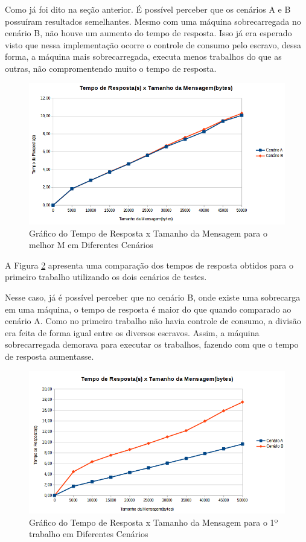 \documentclass[
	12pt,				%
    oneside,			%
	a4paper,			%
	english,			%
	brazil,				%
	]{abntex2}
\begin{document}
Como já foi dito na seção anterior. É possível perceber que os cenários A e B possuíram resultados semelhantes.
Mesmo com uma máquina sobrecarregada no cenário B, não houve um aumento do tempo de resposta. Isso já era esperado visto que nessa implementação ocorre o controle de consumo pelo escravo, dessa forma, a máquina mais sobrecarregada, executa menos trabalhos do que as outras, não compromentendo muito o tempo de resposta.

\begin{figure}[!htb]
\centering
\includegraphics[scale=0.7]{figuras/T2_AxB.png}
\caption{Gráfico do Tempo de Resposta x Tamanho da Mensagem para o melhor M em Diferentes Cenários}
\label{fig:tempo_respostaXtamanho_msg_T2_AxB}
\end{figure}

A Figura \ref{fig:tempo_respostaXtamanho_msg_T1_AxB} apresenta uma comparação dos tempos de resposta obtidos para o primeiro trabalho utilizando os dois cenários de testes.

Nesse caso, já é possível perceber que no cenário B, onde existe uma sobrecarga em uma máquina, o tempo de resposta é maior do que quando comparado ao cenário A. Como no primeiro trabalho não havia controle de consumo, a divisão era feita de forma igual entre os diversos escravos. Assim, a máquina sobrecarregada demorava para executar os trabalhos, fazendo com que o tempo de resposta aumentasse.

\begin{figure}[!htb]
\centering
\includegraphics[scale=0.7]{figuras/T1_AxB.png}
\caption{Gráfico do Tempo de Resposta x Tamanho da Mensagem para o 1º trabalho em Diferentes Cenários}
\label{fig:tempo_respostaXtamanho_msg_T1_AxB}
\end{figure}
\end{document}
